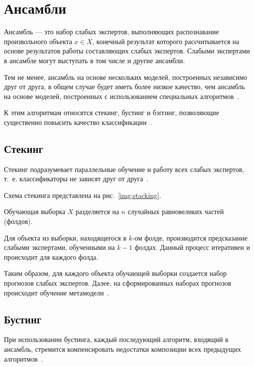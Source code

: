 \section{Ансамбли}

Ансамбль --- это набор слабых экспертов, выполняющих распознавание произвольного объекта $x \in X$, конечный результат которого рассчитывается на основе результатов работы составляющих слабых экспертов. Слабыми экспертами в ансамбле могут выступать в том числе и другие ансамбли.

Тем не менее, ансамбль на основе нескольких моделей, построенных независимо друг от друга, в общем случае будет иметь более низкое качество, чем ансамбль на основе моделей, построенных с использованием специальных алгоритмов~\cite{ensembles}.

К этим алгоритмам относятся стекинг, бустинг и бэггинг, позволяющие существенно повысить качество классификации~\cite{ensembles}.

\subsection{Стекинг}

Стекинг подразумевает параллельные обучение и работу всех слабых экспертов, т.~е. классификаторы не зависят друг от друга~\cite{ensembles}. 

Схема стекинга представлена на рис.~\ref{img:stacking}.


Обучающая выборка $X$ разделяется на $n$ случайных равновеликих частей (фолдов).

Для объекта из выборки, находящегося в $k$-ом фолде, производится предсказание слабыми экспертами, обученными на $k-1$ фолдах. Данный процесс итеративен и происходит для каждого фолда.

Таким образом, для каждого объекта обучающей выборки создается набор прогнозов слабых экспертов. Далее, на сформированных наборах прогнозов происходит обучение метамодели~\cite{ensembles}.

\subsection{Бустинг}

При использовании бустинга, каждый последующий алгоритм, входящий в ансамбль, стремится компенсировать недостатки композиции всех предыдущих алгоритмов~\cite{ensembles}.

